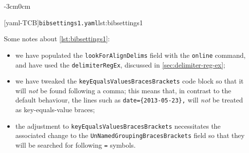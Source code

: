 \documentclass[10pt]{article}
\newenvironment{widepage}{\begin{adjustwidth}{-3cm}{0cm}}{\end{adjustwidth}}
\begin{document}
\begin{example}
 \begin{widepage}
  \begin{cmhtcbraster}[raster column skip=.1\linewidth]
   [yaml-TCB]{\texttt{bibsettings1.yaml}}{lst:bibsettings1}
  \end{cmhtcbraster}
 \end{widepage}
 Some notes about \cref{lst:bibsettings1}:
 \begin{itemize}
  \item we have populated the \texttt{lookForAlignDelims} field with the \texttt{online}
        command, and have used the \texttt{delimiterRegEx}, discussed in
        \vref{sec:delimiter-reg-ex};
  \item we have tweaked the \texttt{keyEqualsValuesBracesBrackets} code block so that it
        will \emph{not} be found following a comma; this means that, in contrast to the
        default behaviour, the lines such as \lstinline!date={2013-05-23},! will
        \emph{not} be treated as key-equals-value braces;
  \item the adjustment to \texttt{keyEqualsValuesBracesBrackets} necessitates the
        associated change to the \texttt{UnNamedGroupingBracesBrackets} field so that
        they will be searched for following \texttt{=} symbols.
 \end{itemize}
 \end{example}
\end{document}
